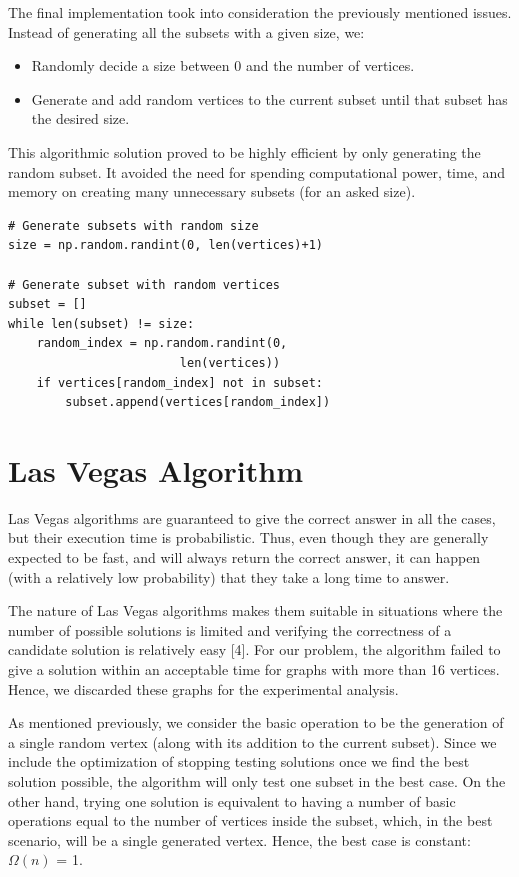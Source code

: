 \documentclass[]{revdetua}
\begin{document}
The final implementation took into consideration the previously mentioned issues. Instead of generating all the subsets with a given size, we:
\begin{itemize}
\item Randomly decide a size between 0 and the number of vertices.
\item Generate and add random vertices to the current subset until that subset has the desired size. 
\end{itemize}

This algorithmic solution proved to be highly efficient by only generating the random subset. It avoided the need for spending computational power, time, and memory on creating many unnecessary subsets (for an asked size).

\pagebreak

\begin{verbatim}
# Generate subsets with random size
size = np.random.randint(0, len(vertices)+1)

# Generate subset with random vertices
subset = []
while len(subset) != size:
    random_index = np.random.randint(0, 
                        len(vertices))
    if vertices[random_index] not in subset:
        subset.append(vertices[random_index])
\end{verbatim}

\section{Las Vegas Algorithm}

Las Vegas algorithms are guaranteed to give the correct answer in all the cases, but their execution time is probabilistic. Thus, even though they are generally expected to be fast, and will always return the correct answer, it can happen (with a relatively low probability) that they take a long time to answer.

The nature of Las Vegas algorithms makes them suitable in situations where the number of possible solutions is limited and verifying the correctness of a candidate solution is relatively easy [4]. For our problem, the algorithm failed to give a solution within an acceptable time for graphs with more than 16 vertices. Hence, we discarded these graphs for the experimental analysis. 

As mentioned previously, we consider the basic operation to be the generation of a single random vertex (along with its addition to the current subset). Since we include the optimization of stopping testing solutions once we find the best solution possible, the algorithm will only test one subset in the best case. On the other hand, trying one solution is equivalent to having a number of basic operations equal to the number of vertices inside the subset, which, in the best scenario, will be a single generated vertex. Hence, the best case is constant: $\Omega(n)$ = 1.
\end{document}
